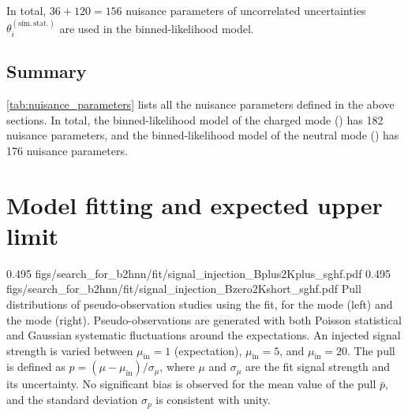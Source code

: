 In total, $36+120=156$ nuisance parameters of uncorrelated uncertainties $\theta_i^{(\mathrm{sim.\,stat.})}$ are used in the binned-likelihood model.
\subsection{Summary} \label{sec:syst_summary}
\cref{tab:nuisance_parameters} lists all the nuisance parameters defined in the above sections.
In total, the binned-likelihood model of the charged mode (\BKpnn) has 182 nuisance parameters, and the binned-likelihood model of the neutral mode (\BKznn) has 176 nuisance parameters.

\clearpage
\section{Model fitting and expected upper limit} \label{sec:fit}
{0.495}
{figs/search_for_b2hnn/fit/signal_injection_Bplus2Kplus_sghf.pdf}
{0.495}
{figs/search_for_b2hnn/fit/signal_injection_Bzero2Kshort_sghf.pdf}
{
Pull distributions of pseudo-observation studies using the \sghf fit, for the \BKpnn mode (left) and the \BKznn mode (right).
Pseudo-observations are generated with both Poisson statistical and Gaussian systematic fluctuations around the expectations.
An injected signal strength is varied between $\mu_{\mathrm{in}}=1$ (\SM expectation), $\mu_{\mathrm{in}}=5$, and $\mu_{\mathrm{in}}=20$.
The pull is defined as $p=(\mu-\mu_{\mathrm{in}})/\sigma_{\mu}$, where $\mu$ and $\sigma_{\mu}$ are the fit signal strength and its uncertainty.
No significant bias is observed for the mean value of the pull $\bar{p}$, and the standard deviation $\sigma_{p}$ is consistent with unity.
}

